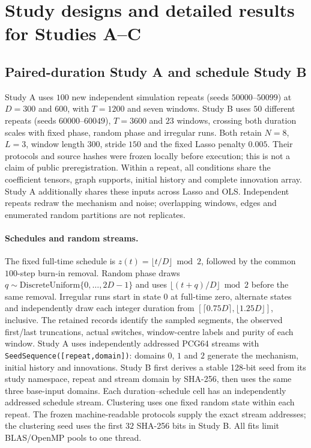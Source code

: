 \documentclass[11pt]{article}
\begin{document}
\FloatBarrier
\section{Study designs and detailed results for Studies A--C}
\label{supp:studies-abc}

\subsection{Paired-duration Study A and schedule Study B}
\label{app:frozen-studies}

Study A uses $100$ new independent simulation repeats (seeds $50000$--$50099$)
at $D=300$ and $600$, with $T=1200$ and seven windows. Study B uses $50$
different repeats (seeds $60000$--$60049$), $T=3600$ and $23$ windows, crossing
both duration scales with fixed phase, random phase and irregular runs.
Both retain $N=8$, $L=3$, window length $300$, stride $150$ and the fixed
Lasso penalty $0.005$. Their protocols and source hashes were frozen locally
before execution; this is not a claim of public preregistration. Within a
repeat, all conditions share the coefficient tensors, graph supports, initial
history and complete innovation array. Study A additionally shares these inputs
across Lasso and OLS. Independent repeats redraw the mechanism and noise;
overlapping windows, edges and enumerated random partitions are not replicates.

\paragraph{Schedules and random streams.}
The fixed full-time schedule is $z(t)=\lfloor t/D\rfloor\bmod2$, followed by
the common $100$-step burn-in removal. Random phase draws
$q\sim\mathrm{DiscreteUniform}\{0,\ldots,2D-1\}$ and uses
$\lfloor(t+q)/D\rfloor\bmod2$ before the same removal. Irregular runs start
in state $0$ at full-time zero, alternate states and independently draw each
integer duration from $[\lceil0.75D\rceil,\lfloor1.25D\rfloor]$, inclusive.
The retained records identify the sampled segments, the observed first/last
truncations, actual switches, window-centre labels and purity of each window.
Study A uses independently addressed PCG64 streams with
\texttt{SeedSequence([repeat,domain])}: domains $0$, $1$ and $2$ generate the
mechanism, initial history and innovations. Study B first derives a stable
128-bit seed from its study namespace, repeat and stream domain by SHA-256,
then uses the same three base-input domains. Each duration--schedule cell has
an independently addressed schedule stream. Clustering uses one fixed random
state within each repeat. The frozen machine-readable protocols supply the
exact stream addresses; the clustering seed uses the first $32$ SHA-256 bits
in Study B. All fits limit BLAS/OpenMP pools to one thread.
\end{document}
